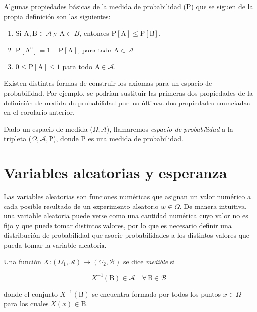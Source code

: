\begin{corolario}\label{cor:propiedades-adicionales}
    Algunas propiedades básicas de la medida de probabilidad ($\mathrm{P}$) que se siguen de la propia definición son las siguientes:

    \begin{enumerate}
        \item Si $\mathrm{A}, \mathrm{B} \in \mathcal{A}$ y $\mathrm{A} \subset B$, entonces $\mathrm{P}[\mathrm{A}] \le \mathrm{P}[\mathrm{B}]$.
        \item $\mathrm{P}[\mathrm{A^c}] = 1-\mathrm{P}[\mathrm{A}]$, para todo $\mathrm{A} \in \mathcal{A}$.
        \item $0 \le \mathrm{P}[\mathrm{A}] \le 1$ para todo $\mathrm{A} \in \mathcal{A}$.
    \end{enumerate}
\end{corolario}

\begin{observacion}
Existen distintas formas de construir los axiomas para un espacio de probabilidad. Por ejemplo, se podrían sustituir las primeras dos propiedades de la definición de medida de probabilidad por las últimas dos propiedades enunciadas en el corolario anterior.
\end{observacion}

\begin{definicion}\label{def:espacio-de-probabilidad}
    Dado un espacio de medida ($\Omega, \mathcal{A}$), llamaremos \emph{espacio de probabilidad} a la tripleta ($\Omega, \mathcal{A}, \mathrm{P}$), donde $\mathrm{P}$ es una medida de probabilidad.
\end{definicion}

\section{Variables aleatorias y esperanza}

Las variables aleatorias son funciones numéricas que asignan un valor numérico a cada posible resultado de un experimento aleatorio $w \in \Omega$. De manera intuitiva, una variable aleatoria puede verse como una cantidad numérica cuyo valor no es fijo y que puede tomar distintos valores, por lo que es necesario definir una distribución de probabilidad que asocie probabilidades a los distintos valores que pueda tomar la variable aleatoria. 

\begin{definicion}\label{def:funcion-medible}
    Una función $X: (\Omega_1, \mathcal{A}) \to (\Omega_2, \mathcal{B})$ se dice \emph{medible} si

    \[ X^{-1}(\mathrm{B}) \in \mathcal{A} \quad \forall \, \mathrm{B}  \in \mathcal{B} \]

    donde el conjunto $ X^{-1}(\mathrm{B})$ se encuentra formado por todos los puntos $x \in \Omega$ para los cuales $X(x) \in \mathrm{B}$.
\end{definicion}

